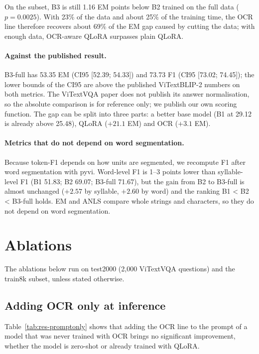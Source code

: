 On the subset, B3 is still 1.16 EM points below B2 trained on the full data
($p = 0.0025$). With 23\% of the data and about 25\% of the training time, the OCR line
therefore recovers about 69\% of the EM gap caused by cutting the data; with enough data,
OCR-aware QLoRA surpasses plain QLoRA.

\paragraph{Against the published result.} B3-full has 53.35 EM (CI95 [52.39; 54.33]) and
73.73 F1 (CI95 [73.02; 74.45]); the lower bounds of the CI95 are above the published
ViTextBLIP-2 numbers on both metrics. The ViTextVQA paper does not publish its answer
normalisation, so the absolute comparison is for reference only; we publish our
own scoring function. The gap can be split into three parts: a better base model (B1 at
29.12 is already above 25.48), QLoRA ($+21.1$ EM) and OCR ($+3.1$ EM).

\paragraph{Metrics that do not depend on word segmentation.} Because token-F1 depends on how
units are segmented, we recompute F1 after word segmentation with pyvi. Word-level
F1 is 1--3 points lower than syllable-level F1 (B1 51.83; B2 69.07; B3-full 71.67), but the
gain from B2 to B3-full is almost unchanged ($+2.57$ by syllable, $+2.60$ by word) and the
ranking B1 < B2 < B3-full holds. EM and ANLS compare whole strings and characters, so they
do not depend on word segmentation.

\section{Ablations}
\label{sec:res-ablation}

The ablations below run on test2000 (2,000 ViTextVQA questions) and the train8k subset,
unless stated otherwise.

\subsection{Adding OCR only at inference}
\label{sec:res-promptonly}

Table~\ref{tab:res-promptonly} shows that adding the OCR line to the prompt of a model that
was never trained with OCR brings no significant improvement, whether the model is
zero-shot or already trained with QLoRA.


